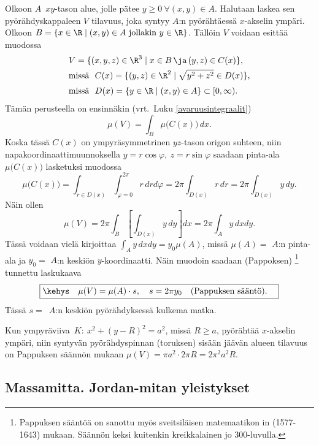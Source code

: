 Olkoon $A$ $\,xy$-tason alue, jolle pätee $y \ge 0\ \forall (x,y) \in A$.
Halutaan laskea sen pyörähdyskappaleen $V$ tilavuus, joka syntyy $A$:n pyörähtäessä
$x$-akselin ympäri. Olkoon $B=\{x\in\R \mid (x,y)\in A\ \text{jollakin}\ y\in\R\}$.
Tällöin $V$ voidaan esittää muodossa
\begin{align*}
&V = \{(x,y,z)\in\R^3 \mid x \in B\,\ja\,(y,z) \in C(x)\}, \\
&\text{missä}\ \ C(x) = \{(y,z)\in\R^2 \mid \sqrt{y^2+z^2} \in D(x)\}, \\[1mm]
&\text{missä}\ \ D(x) =\{y\in\R \mid (x,y) \in A\} \subset [0,\infty).
\end{align*}
Tämän perusteella on ensinnäkin (vrt.\ Luku \ref{avaruusintegraalit})
\[
\mu(V)=\int_B \mu\bigl(C(x)\bigr)\,dx.
\]
Koska tässä $C(x)$ on ympyräsymmetrinen $yz$-tason origon suhteen, niin
napakoordinaattimuunnoksella $y=r\cos\varphi,\ z=r\sin\varphi$ saadaan
pinta-ala $\mu\bigl(C(x)\bigr)$ lasketuksi muodossa
\[
\mu\bigl(C(x)\bigr)=\int_{r \in D(x)}\int_{\varphi=0}^{2\pi} r\,drd\varphi
                   =2\pi\int_{D(x)} r\,dr
                   =2\pi\int_{D(x)} y\,dy.
\]
Näin ollen
\[
\mu(V) = 2\pi\int_B\left[\int_{D(x)} y\,dy\right]dx = 2\pi\int_A y\,dxdy.
\]
Tässä voidaan vielä kirjoittaa $\int_A y\,dxdy = y_0\mu(A)$, missä $\mu(A)=$ $A$:n
pinta-ala ja $y_0=$ $A$:n keskiön $y$-koordinaatti. Näin muodoin saadaan 
(Pappoksen) \footnote[2]{Pappuksen sääntöä on sanottu myös
 sveitsiläisen matemaatikon in (1577-1643) mukaan.
Säännön keksi kuitenkin kreikkalainen  jo 300-luvulla. 
 } tunnettu laskukaava
\[
\boxed{\kehys\quad \mu(V)=\mu(A) \cdot s, \quad s=2\pi y_0 \quad 
                                          \text{(Pappuksen sääntö)}. \quad}
\]
Tässä $s=\,$ $A$:n keskiön pyörähdyksessä kulkema matka.
\begin{Exa} Kun ympyräviiva $\,K:\ x^2+(y-R)^2=a^2$, missä $R \ge a$, pyörähtää 
$x$-akselin ympäri, niin syntyvän pyörähdyspinnan (toruksen) sisään jäävän alueen
tilavuus on Pappuksen säännön mukaan $\mu(V)=\pi a^2 \cdot 2\pi R = 2\pi^2 a^2 R$.
\loppu
\end{Exa}  

\subsection*{Massamitta. Jordan-mitan yleistykset}

